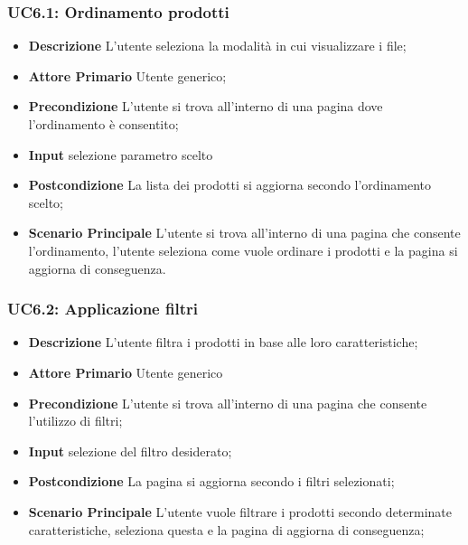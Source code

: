         \subsubsection{UC6.1: Ordinamento prodotti}
        \label{sec:UC6.1}
        \begin{itemize}
            \item \textbf{Descrizione} L'utente seleziona la modalità in cui visualizzare i file;
            \item \textbf{Attore Primario} Utente generico;
            \item \textbf{Precondizione} L'utente si trova all'interno di una pagina dove l'ordinamento è consentito;
            \item \textbf{Input} selezione parametro scelto
            \item \textbf{Postcondizione} La lista dei prodotti si aggiorna secondo l'ordinamento scelto;
            \item \textbf{Scenario Principale} L'utente si trova all'interno di una pagina che consente l'ordinamento, l'utente seleziona come vuole ordinare i prodotti e la pagina si aggiorna di conseguenza.
        \end{itemize}
        \subsubsection{UC6.2: Applicazione filtri}
        \label{sec:UC6.2}
        \begin{itemize}
            \item \textbf{Descrizione} L'utente filtra i prodotti in base alle loro caratteristiche;
            \item \textbf{Attore Primario} Utente generico
            \item \textbf{Precondizione} L'utente si trova all'interno di una pagina che consente l'utilizzo di filtri;
            \item \textbf{Input} selezione del filtro desiderato;
            \item \textbf{Postcondizione} La pagina si aggiorna secondo i filtri selezionati;
            \item \textbf{Scenario Principale} L'utente vuole filtrare i prodotti secondo determinate caratteristiche, seleziona questa e la pagina di aggiorna di conseguenza;
        \end{itemize}
